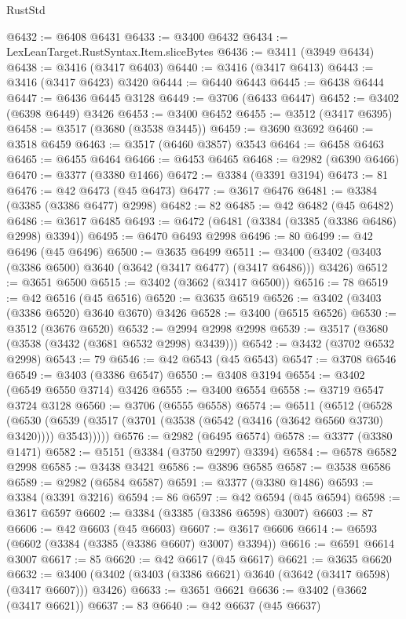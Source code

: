 \begin{lexlean}{RustStd}
\begin{coremodule}
@6432 := @6408 @6431
@6433 := @3400 @6432
@6434 := LexLeanTarget.RustSyntax.Item.sliceBytes
@6436 := @3411 (@3949 @6434)
@6438 := @3416 (@3417 @6403)
@6440 := @3416 (@3417 @6413)
@6443 := @3416 (@3417 @6423) @3420
@6444 := @6440 @6443
@6445 := @6438 @6444
@6447 := @6436 @6445 @3128
@6449 := @3706 (@6433 @6447)
@6452 := @3402 (@6398 @6449) @3426
@6453 := @3400 @6452
@6455 := @3512 (@3417 @6395)
@6458 := @3517 (@3680 (@3538 @3445))
@6459 := @3690 @3692
@6460 := @3518 @6459
@6463 := @3517 (@6460 @3857) @3543
@6464 := @6458 @6463
@6465 := @6455 @6464
@6466 := @6453 @6465
@6468 := @2982 (@6390 @6466)
@6470 := @3377 (@3380 @1466)
@6472 := @3384 (@3391 @3194)
@6473 := 81
@6476 := @42 @6473 (@45 @6473)
@6477 := @3617 @6476
@6481 := @3384 (@3385 (@3386 @6477) @2998)
@6482 := 82
@6485 := @42 @6482 (@45 @6482)
@6486 := @3617 @6485
@6493 := @6472 (@6481 (@3384 (@3385 (@3386 @6486) @2998) @3394))
@6495 := @6470 @6493 @2998
@6496 := 80
@6499 := @42 @6496 (@45 @6496)
@6500 := @3635 @6499
@6511 := @3400 (@3402 (@3403 (@3386 @6500) @3640 (@3642 (@3417 @6477) (@3417 @6486))) @3426)
@6512 := @3651 @6500
@6515 := @3402 (@3662 (@3417 @6500))
@6516 := 78
@6519 := @42 @6516 (@45 @6516)
@6520 := @3635 @6519
@6526 := @3402 (@3403 (@3386 @6520) @3640 @3670) @3426
@6528 := @3400 (@6515 @6526)
@6530 := @3512 (@3676 @6520)
@6532 := @2994 @2998 @2998
@6539 := @3517 (@3680 (@3538 (@3432 (@3681 @6532 @2998) @3439)))
@6542 := @3432 (@3702 @6532 @2998)
@6543 := 79
@6546 := @42 @6543 (@45 @6543)
@6547 := @3708 @6546
@6549 := @3403 (@3386 @6547)
@6550 := @3408 @3194
@6554 := @3402 (@6549 @6550 @3714) @3426
@6555 := @3400 @6554
@6558 := @3719 @6547 @3724 @3128
@6560 := @3706 (@6555 @6558)
@6574 := @6511
    (@6512
      (@6528
        (@6530 (@6539 (@3517 (@3701 (@3538 (@6542 (@3416 (@3642 @6560 @3730) @3420)))) @3543)))))
@6576 := @2982 (@6495 @6574)
@6578 := @3377 (@3380 @1471)
@6582 := @5151 (@3384 (@3750 @2997) @3394)
@6584 := @6578 @6582 @2998
@6585 := @3438 @3421
@6586 := @3896 @6585
@6587 := @3538 @6586
@6589 := @2982 (@6584 @6587)
@6591 := @3377 (@3380 @1486)
@6593 := @3384 (@3391 @3216)
@6594 := 86
@6597 := @42 @6594 (@45 @6594)
@6598 := @3617 @6597
@6602 := @3384 (@3385 (@3386 @6598) @3007)
@6603 := 87
@6606 := @42 @6603 (@45 @6603)
@6607 := @3617 @6606
@6614 := @6593 (@6602 (@3384 (@3385 (@3386 @6607) @3007) @3394))
@6616 := @6591 @6614 @3007
@6617 := 85
@6620 := @42 @6617 (@45 @6617)
@6621 := @3635 @6620
@6632 := @3400 (@3402 (@3403 (@3386 @6621) @3640 (@3642 (@3417 @6598) (@3417 @6607))) @3426)
@6633 := @3651 @6621
@6636 := @3402 (@3662 (@3417 @6621))
@6637 := 83
@6640 := @42 @6637 (@45 @6637)

\end{coremodule}
\end{lexlean}
